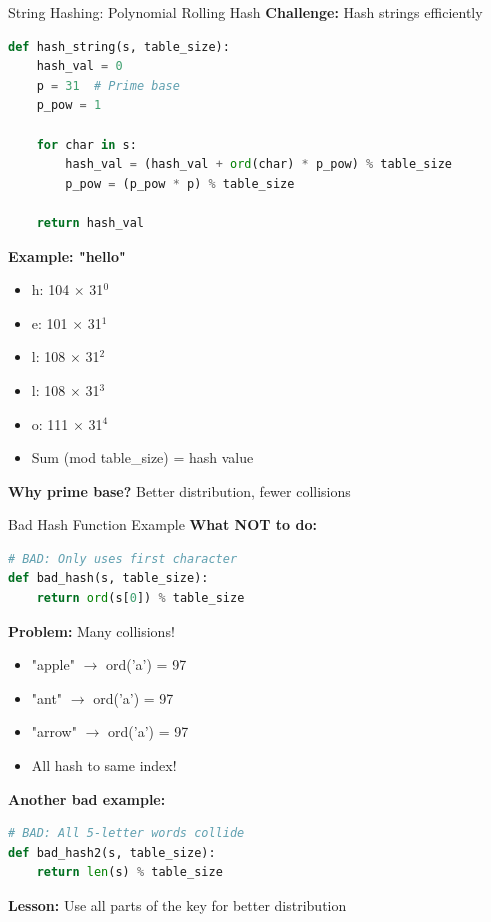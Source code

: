 \documentclass[aspectratio=169]{beamer}
\begin{document}
\begin{frame}[fragile]{String Hashing: Polynomial Rolling Hash}
  \textbf{Challenge:} Hash strings efficiently

  \begin{lstlisting}[language=Python, basicstyle=\ttfamily\small]
def hash_string(s, table_size):
    hash_val = 0
    p = 31  # Prime base
    p_pow = 1

    for char in s:
        hash_val = (hash_val + ord(char) * p_pow) % table_size
        p_pow = (p_pow * p) % table_size

    return hash_val
  \end{lstlisting}

  \vspace{0.3cm}
  \textbf{Example: "hello"}
  \begin{itemize}
    \item h: 104 $\times$ 31$^0$
    \item e: 101 $\times$ 31$^1$
    \item l: 108 $\times$ 31$^2$
    \item l: 108 $\times$ 31$^3$
    \item o: 111 $\times$ 31$^4$
    \item Sum (mod table\_size) = hash value
  \end{itemize}

  \vspace{0.2cm}
  \textbf{Why prime base?} Better distribution, fewer collisions
\end{frame}

\begin{frame}[fragile]{Bad Hash Function Example}
  \textbf{What NOT to do:}

  \begin{lstlisting}[language=Python, basicstyle=\ttfamily\small]
# BAD: Only uses first character
def bad_hash(s, table_size):
    return ord(s[0]) % table_size
  \end{lstlisting}

  \vspace{0.3cm}
  \textbf{Problem:} Many collisions!
  \begin{itemize}
    \item "apple" $\rightarrow$ ord('a') = 97
    \item "ant" $\rightarrow$ ord('a') = 97
    \item "arrow" $\rightarrow$ ord('a') = 97
    \item All hash to same index!
  \end{itemize}

  \vspace{0.3cm}
  \textbf{Another bad example:}
  \begin{lstlisting}[language=Python, basicstyle=\ttfamily\small]
# BAD: All 5-letter words collide
def bad_hash2(s, table_size):
    return len(s) % table_size
  \end{lstlisting}

  \vspace{0.2cm}
  \textbf{Lesson:} Use all parts of the key for better distribution
\end{frame}
\end{document}
